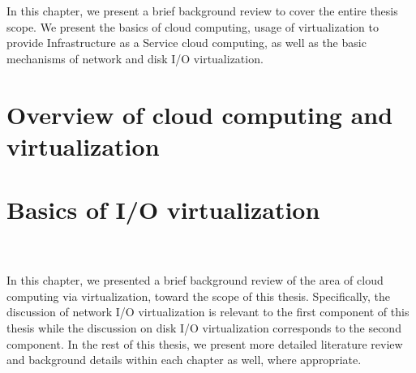 
In this chapter, we present a brief background review to cover 
the entire thesis scope. We present the basics of cloud computing, 
usage of virtualization to provide Infrastructure as a Service cloud
computing, as well as the basic mechanisms of network and disk
I/O virtualization. 

\section{Overview of cloud computing and virtualization}
\label{sec:litreviewchap-cloud-virt}


\section{Basics of I/O virtualization}
\label{sec:litreviewchap-io-virtualization}

\\
\\
In this chapter, we presented a brief background review of the area of
cloud computing via virtualization, toward the scope of this thesis.
Specifically, the discussion of network 
I/O virtualization is relevant
to the first component of this thesis 
while the discussion on disk I/O virtualization corresponds to 
the second component.
In the rest of this thesis, we present more detailed literature review 
and background details within each chapter as well, where appropriate.

